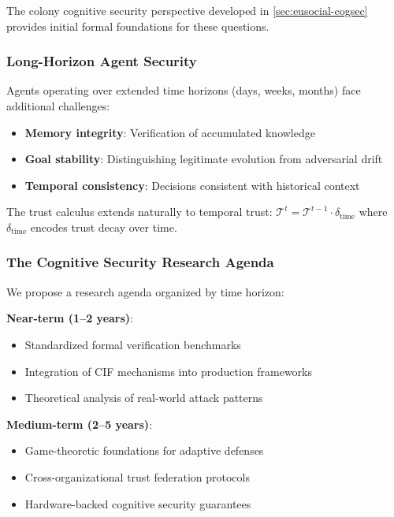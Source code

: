 \documentclass[
]{article}
\begin{document}
The colony cognitive security perspective developed in
\cref{sec:eusocial-cogsec} provides initial formal foundations for these
questions.

\subsubsection{Long-Horizon Agent
Security}\label{long-horizon-agent-security}

Agents operating over extended time horizons (days, weeks, months) face
additional challenges:

\begin{itemize}
\item \textbf{Memory integrity}: Verification of accumulated knowledge
\item \textbf{Goal stability}: Distinguishing legitimate evolution from adversarial drift
\item \textbf{Temporal consistency}: Decisions consistent with historical context
\end{itemize}

The trust calculus extends naturally to temporal trust:
\(\mathcal{T}^{t} = \mathcal{T}^{t-1} \cdot \delta_{\text{time}}\) where
\(\delta_{\text{time}}\) encodes trust decay over time.

\subsubsection{The Cognitive Security Research
Agenda}\label{the-cognitive-security-research-agenda}

We propose a research agenda organized by time horizon:

\textbf{Near-term (1--2 years)}:

\begin{itemize}
\item Standardized formal verification benchmarks
\item Integration of CIF mechanisms into production frameworks
\item Theoretical analysis of real-world attack patterns
\end{itemize}

\textbf{Medium-term (2--5 years)}:

\begin{itemize}
\item Game-theoretic foundations for adaptive defenses
\item Cross-organizational trust federation protocols
\item Hardware-backed cognitive security guarantees
\end{itemize}
\end{document}
